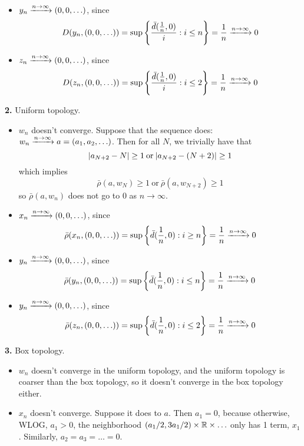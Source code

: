 \documentclass[a4paper, 12pt]{article}
\begin{document}
\begin{solution}
\begin{itemize}
\item $y_n \xrightarrow{n \to \infty} (0, 0, \ldots)$, since \begin{equation*}
    D(y_n, (0, 0, \ldots)) = \sup\left\{\frac{\bar{d}(\frac{1}{n}, 0)}{i} : i \leq n\right\} = \frac{1}{n} \xrightarrow{n \to \infty} 0
    \end{equation*}
\item $z_n \xrightarrow{n \to \infty} (0, 0, \ldots)$,  since \begin{equation*}
    D(z_n, (0, 0, \ldots)) = \sup\left\{\frac{\bar{d}(\frac{1}{n}, 0)}{i} : i \leq 2\right\} = \frac{1}{n} \xrightarrow{n \to \infty} 0
\end{equation*}
\end{itemize}

\textbf{2.} Uniform topology.
\begin{itemize}
\item $w_n$ doesn't converge. Suppose that the sequence does: $w_n \xrightarrow{n \to \infty} a = (a_1, a_2, \ldots)$. Then for all $N$, we trivially have that \begin{equation*}
\lvert a_{N+2} - N\rvert \geq 1 \:\text{or}\: \lvert a_{N+2} - (N+2)\rvert \geq 1
\end{equation*}
which implies \begin{equation*}
\bar{\rho}(a, w_N) \geq 1 \:\text{or}\: \bar{\rho}(a, w_{N+2}) \geq 1
\end{equation*}
so $\bar{\rho}(a, w_n)$ does not go to 0 as $n \to \infty$.

\item $x_n \xrightarrow{n \to \infty} (0, 0, \ldots)$, since \begin{equation*}
\bar{\rho}(x_n, (0, 0, \ldots)) = \sup \left\{\bar{d}(\frac{1}{n}, 0): i\geq n\right\} = \frac{1}{n} \xrightarrow{n \to \infty} 0
\end{equation*}

\item $y_n \xrightarrow{n \to \infty} (0, 0, \ldots)$, since \begin{equation*}
\bar{\rho}(y_n, (0, 0, \ldots)) = \sup \left\{\bar{d}(\frac{1}{n}, 0): i \leq n\right\} = \frac{1}{n} \xrightarrow{n \to \infty} 0
\end{equation*}

\item $y_n \xrightarrow{n \to \infty} (0, 0, \ldots)$, since \begin{equation*}
    \bar{\rho}(z_n, (0, 0, \ldots)) = \sup \left\{\bar{d}(\frac{1}{n}, 0): i \leq 2\right\} = \frac{1}{n} \xrightarrow{n \to \infty} 0
    \end{equation*}
\end{itemize}

\textbf{3.} Box topology.
\begin{itemize}
\item $w_n$ doesn't converge in the uniform topology, and the uniform topology is coarser than the box topology, so it doesn't converge in the box topology either.
\item $x_n$ doesn't converge. Suppose it does to $a$. Then $a_1 = 0$, because otherwise, WLOG, $a_1 > 0$, the neighborhood $(a_1/2, 3a_1/2) \times \mathbb{R} \times \ldots$ only has 1 term, $x_1$. Similarly, $a_2 = a_3 = \ldots = 0$.


\end{itemize}
\end{solution}
\end{document}
